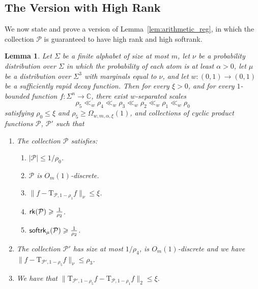 \documentclass[10pt,a4paper]{amsart}
\newtheorem{lemma}[thm]{Lemma}
\newcommand\card[1]{\left| {#1} \right|}
\newcommand\norm[1]{\| #1 \|}
\newcommand\eps{\varepsilon}
\renewcommand\geq{\geqslant}
\renewcommand\leq{\leqslant}
\begin{document}
\subsection{The Version with High Rank}
We now state and prove a version of Lemma~\ref{lem:arithmetic_reg}, in which the collection $\mathcal{P}$ is guaranteed to have high rank and high softrank. 
\begin{lemma}\label{lem:arithmetic_reg_high_rank}
    Let $\Sigma$ be a finite alphabet of size at most $m$, let $\nu$ be a probability distribution over $\Sigma$ in which the probability of each atom is at least $\alpha>0$, 
    let $\mu$ be a distribution over $\Sigma^3$ with marginals equal to $\nu$, and let $w\colon (0,1)\to(0,1)$ be a sufficiently rapid decay function. Then for every $\xi>0$, and for every $1$-bounded function $f:\Sigma^n\to\mathbb{C}$, there exist $w$-separated scales
    \[
    \rho_5\ll_{w}\rho_4\ll_w\rho_3\ll_w\rho_2\ll_w\rho_1\ll_w\rho_0
\]
satisfying $\rho_0\leq \xi$ and $\rho_5\geq \Omega_{w,m,\alpha,\xi}(1)$, and collections of cyclic product functions $\mathcal{P}$, $\mathcal{P}'$ such that


    
    \begin{enumerate}
        \item The collection $\mathcal{P}$ satisfies:
        \begin{enumerate}
            \item $\card{\mathcal{P}}\leq 1/\rho_0$.
            \item $\mathcal{P}$ is $O_{m}(1)$-discrete.
            \item $\norm{f-\mathrm{T}_{\mathcal{P},1-\rho_{1}}f}_{\nu}\leq \xi$.
            \item ${\sf rk}(\mathcal{P})\geq \frac{1}{\rho_{2}}$.
            \item ${\sf softrk}_{\mu}(\mathcal{P})\geq \frac{1}{\rho_{2}}$.
        \end{enumerate}
        \item The collection $\mathcal{P}'$ has size at most $1/\rho_{4}$, is $O_{m}(1)$-discrete and we have $\norm{f-\mathrm{T}_{\mathcal{P}',1-\rho_{5}}f}_{\nu}\leq \rho_{3}$.
        \item We have that 
        $\norm{\mathrm{T}_{\mathcal{P}',1-\rho_{5}}f -\mathrm{T}_{\mathcal{P},1-\rho_{1}} f}_2\leq \xi$.
    \end{enumerate}
\end{lemma}
\end{document}

